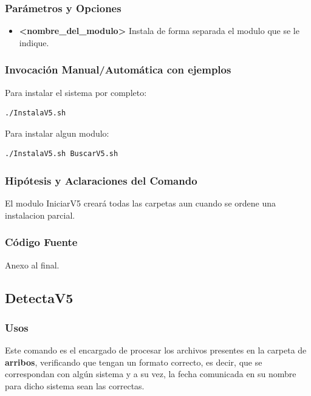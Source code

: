 \documentclass[a4paper,10pt,titlepage]{article}
\begin{document}
		\subsubsection{Par\'ametros y Opciones}
			\begin {itemize}
				\item \textbf{<nombre\_del\_modulo>} {Instala de forma separada el modulo que se le indique.}
			\end{itemize}
	
		\subsubsection{Invocaci\'on Manual/Autom\'atica con ejemplos}

Para instalar el sistema por completo:

\begin{verbatim}
./InstalaV5.sh
 \end{verbatim}

Para instalar algun modulo:

\begin{verbatim}
./InstalaV5.sh BuscarV5.sh
 \end{verbatim}

		\subsubsection{Hip\'otesis y Aclaraciones del Comando}

El modulo IniciarV5 creará todas las carpetas aun cuando se ordene una instalacion parcial.


		\subsubsection{C\'odigo Fuente}
			Anexo al final.


	\subsection{DetectaV5}
		\subsubsection{Usos}
		Este comando es el encargado de procesar los archivos presentes en la carpeta de \textbf{arribos}, verificando que tengan un formato correcto, es decir, que se correspondan con alg\'un sistema y a su vez, la fecha comunicada en su nombre para dicho sistema sean las correctas. 
\end{document}
